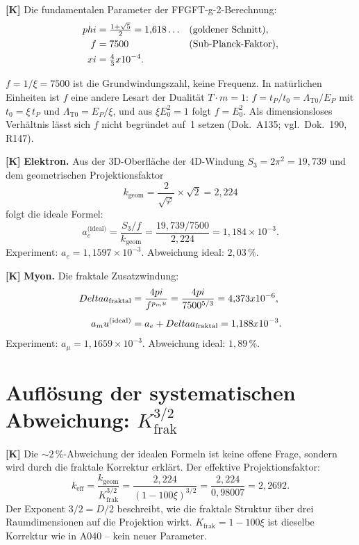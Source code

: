 \textbf{[K]} Die fundamentalen Parameter der FFGFT-g-2-Berechnung:
\begin{align}
  \varphi &= \tfrac{1+\sqrt5}{2} = 1{,}618\ldots &&(\text{goldener Schnitt}), \notag\\
  f       &= 7500 &&(\text{Sub-Planck-Faktor}), \notag\\
  \xi     &= \tfrac43\times10^{-4}. \notag
\end{align}

$f = 1/\xi = 7500$ ist die Grundwindungszahl, keine Frequenz. In natürlichen Einheiten ist $f$ eine andere Lesart der Dualität $T\cdot m = 1$: $f = t_P/t_0 = \Lambda_{\text{T0}}/E_P$ mit $t_0 = \xi\,t_P$ und $\Lambda_{\text{T0}} = E_P/\xi$, und aus $\xi E_0^2 = 1$ folgt $f = E_0^2$. Als dimensionsloses Verhältnis lässt sich $f$ nicht begründet auf~1 setzen (Dok.~A135; vgl.\ Dok.~190, R147).

\textbf{[K]} \textbf{Elektron.} Aus der 3D-Oberfläche der 4D-Windung
$S_3=2\pi^2=19{,}739$ und dem geometrischen Projektionsfaktor
\[
  k_\text{geom} = \frac{2}{\sqrt\varphi}\times\sqrt2 = 2{,}224
\]
folgt die ideale Formel:
\[
  a_e^\text{(ideal)} = \frac{S_3/f}{k_\text{geom}}
  = \frac{19{,}739/7500}{2{,}224} = 1{,}184\times10^{-3}.
\]
Experiment: $a_e=1{,}1597\times10^{-3}$. Abweichung ideal: $2{,}03\,\%$.

\textbf{[K]} \textbf{Myon.} Die fraktale Zusatzwindung:
\begin{align}
  \Delta a_\text{fraktal} &= \frac{4\pi}{f^{p_\mu}} = \frac{4\pi}{7500^{5/3}}
  = 4{,}373\times10^{-6}, \notag\\[4pt]
  a_\mu^\text{(ideal)} &= a_e + \Delta a_\text{fraktal} = 1{,}188\times10^{-3}. \notag
\end{align}
Experiment: $a_\mu=1{,}1659\times10^{-3}$. Abweichung ideal: $1{,}89\,\%$.

\section{Auflösung der systematischen Abweichung: \texorpdfstring{$K_\text{frak}^{3/2}$}{K\_frak\textasciicircum 3/2}}

\textbf{[K]} Die $\sim2\,\%$-Abweichung der idealen Formeln ist keine offene
Frage, sondern wird durch die fraktale Korrektur erklärt. Der effektive
Projektionsfaktor:
\[
  k_\text{eff}
  = \frac{k_\text{geom}}{K_\text{frak}^{3/2}}
  = \frac{2{,}224}{(1-100\xi)^{3/2}}
  = \frac{2{,}224}{0{,}98007}
  = 2{,}2692.
\]
Der Exponent $3/2=D/2$ beschreibt, wie die fraktale Struktur über drei
Raumdimensionen auf die Projektion wirkt. $K_\text{frak}=1-100\xi$ ist
dieselbe Korrektur wie in A040 -- kein neuer Parameter.

